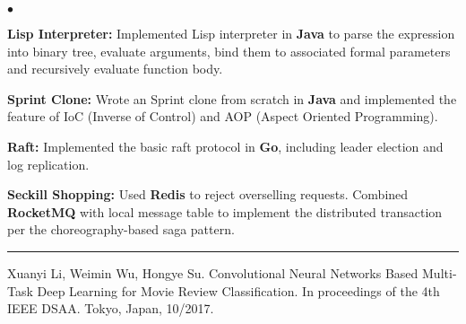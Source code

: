 \documentclass[letterpaper,10pt]{article}
\newcommand{\listparam}{
    \setlength{\parsep}{\parskip}
    \setlength{\itemsep}{0.2ex}
    \setlength{\labelwidth}{2em}
    \setlength{\labelsep}{1em}
    \setlength{\topsep}{0pt}
    \setlength{\partopsep}{0.2ex}
    \setlength{\leftmargin}{2em}
}
\renewcommand{\section}[1]{\vspace{4pt}{\large\textbf{#1}}\vspace{1pt}\hrule\vspace{2pt}}
\begin{document}
\begin{list}{$\bullet$}{\listparam}
\item \textbf{Lisp Interpreter:} Implemented Lisp interpreter in \textbf{Java} to parse the expression into binary tree, evaluate arguments, bind them to associated formal parameters and recursively evaluate function body.
\item \textbf{Sprint Clone:} Wrote an Sprint clone from scratch in \textbf{Java} and implemented the feature of IoC (Inverse of Control) and AOP (Aspect Oriented Programming).
\item \textbf{Raft:} Implemented the basic raft protocol in \textbf{Go}, including leader election and log replication.
\item \textbf{Seckill Shopping:} Used \textbf{Redis} to reject overselling requests. Combined \textbf{RocketMQ} with local message table to implement the distributed transaction per the choreography-based saga pattern.
\end{list}

\section{PUBLICATION}

Xuanyi Li, Weimin Wu, Hongye Su. Convolutional Neural Networks Based Multi-Task Deep Learning for
Movie Review Classification. In proceedings of the 4th IEEE DSAA. Tokyo, Japan, 10/2017.
\end{document}
